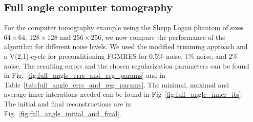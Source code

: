 \subsection{Full angle computer tomography}
For the computer tomography example using the Shepp Logan phantom of sizes $64 \times 64$, $128 \times 128$ and $256 \times 256$, we now compare the performance of the algorithm for different noise levels. We used the modified trimming approach and a V(2,1)-cycle for preconditioning FGMRES for 0.5\% noise, 1\% noise, and 2\% noise. The resulting errors and the chosen regularization parameters can be found in Fig.~\ref{fig:full_angle_errs_and_reg_params} and in Table~\ref{tab:full_angle_errs_and_reg_params}. The minimal, maximal and average inner interations needed can be found in Fig~\ref{fig:full_angle_inner_its}. The initial and final reconstructions are in Fig.~\ref{fig:full_angle_initial_and_final}.

